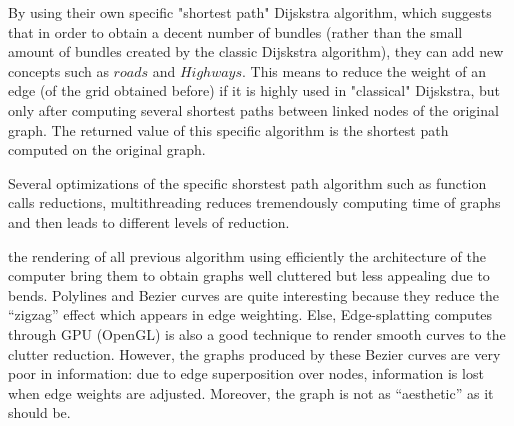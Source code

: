  By using their own specific "shortest path" Dijskstra  algorithm, which suggests that in order to obtain a decent number of bundles (rather than the small amount of bundles created by the classic Dijskstra algorithm), they can add new concepts such as $roads$ and $Highways$. This means to reduce the weight of an edge (of the grid obtained before) if it is highly used in "classical" Dijskstra, but only after computing several shortest paths between linked nodes of the original graph. The returned value of this specific algorithm is the shortest path computed on the original graph.

  Several optimizations of the specific shorstest path algorithm such as function calls reductions, multithreading reduces tremendously computing time of graphs and then leads to different levels of reduction.

the rendering of all previous algorithm using efficiently the architecture of the computer bring them to obtain graphs well cluttered but less appealing due to bends. Polylines and Bezier curves are quite interesting because they reduce the “zigzag” effect which appears in edge weighting. Else, Edge-splatting computes through GPU (OpenGL) is also a good technique to render smooth curves to the clutter reduction. However, the graphs produced by these Bezier curves are very poor in information: due to edge superposition over nodes, information is lost when edge weights are adjusted. Moreover, the graph is not as “aesthetic” as it should be.
